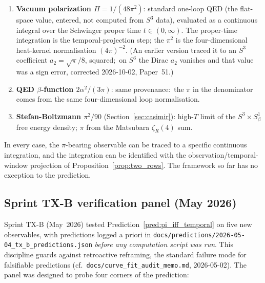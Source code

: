 \documentclass[11pt]{article}
\begin{document}
\begin{enumerate}
\setlength\itemsep{0pt}
\item \textbf{Vacuum polarization $\Pi = 1/(48\pi^2)$}:
standard one-loop QED (the flat-space value, entered, not computed from $S^3$ data), evaluated as a continuous integral over
the Schwinger proper time $t \in (0, \infty)$.  The proper-time
integration is the temporal-projection step; the $\pi^2$ is the
four-dimensional heat-kernel normalisation $(4\pi)^{-2}$.  (An earlier
version traced it to an $S^3$ coefficient $a_2 = \sqrt{\pi}/8$, squared;\
on $S^3$ the Dirac $a_2$ vanishes and that value was a sign error,
corrected 2026-10-02, Paper~51.)
\item \textbf{QED $\beta$-function $2\alpha^2/(3\pi)$}:
same provenance:\ the $\pi$ in the denominator comes from the same
four-dimensional loop normalisation.
\item \textbf{Stefan-Boltzmann $\pi^2/90$} (Section~\ref{sec:casimir}):
high-$T$ limit of the $S^3 \times S^1_\beta$ free energy density;
$\pi$ from the Matsubara $\zeta_R(4)$ sum.
\end{enumerate}

In every case, the $\pi$-bearing observable can be traced to a specific
continuous integration, and the integration can be identified with the
observation/temporal-window projection of
Proposition~\ref{prop:two_rows}.  The framework so far has no exception
to the prediction.

\subsection{Sprint TX-B verification panel (May 2026)}
\label{sec:tx_b}

Sprint TX-B (May~2026) tested Prediction~\ref{pred:pi_iff_temporal} on
five new observables, with predictions logged a priori in
\texttt{docs/predictions/2026-05-04\_tx\_b\_predictions.json} \emph{before any
computation script was run}.  This discipline guards against
retroactive reframing, the standard failure mode for falsifiable
predictions (cf.\ \texttt{docs/curve\_fit\_audit\_memo.md},
2026-05-02).  The panel was designed to probe four corners of the
prediction:
\end{document}
